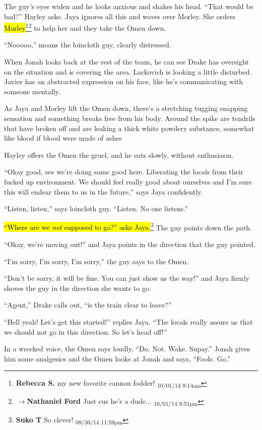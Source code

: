 The guy's eyes widen and he looks anxious and shakes his head.  ``That would be bad?'' Hayley asks.  Jaya ignores all this and waves over Morley.  She orders \hl{Morley}\footnote{\textbf{Rebecca S. }my new favorite cannon fodder! \textsubscript{10/01/14 9:14am}}\footnote{$\rightarrow$\textbf{Nathaniel Ford }Just cus he's a dude... \textsubscript{10/01/14 9:51pm}} to help her and they take the Omen down.

``Nooooo,'' moans the loincloth guy, clearly distressed.

When Jonah looks back at the rest of the team, he can see Drake has oversight on the situation and is covering the area.  Lackovich is looking a little disturbed.  Javier has an abstracted expression on his face, like he's communicating with someone mentally.

As Jaya and Morley lift the Omen down, there's a stretching tugging snapping sensation and something breaks free from his body.  Around the spike are tendrils that have broken off and are leaking a thick white powdery substance, somewhat like blood if blood were made of ashes

Hayley offers the Omen the gruel, and he eats slowly, without enthusiasm.

``Okay good, see we're doing some good here.  Liberating the locals from their fucked up environment.  We should feel really good about ourselves and I'm sure this will endear them to us in the future,'' says Jaya confidently.

``Listen, listen,'' says loincloth guy. ``Listen. No one listens.''

\hl{``Where are we \textit{not} supposed to go?'' asks Jaya.}\footnote{\textbf{Suko T }So clever! \textsubscript{09/30/14 11:59pm}}  The guy points down the path.

``Okay, we're moving out!'' and Jaya points in the direction that the guy pointed.

``I'm sorry, I'm sorry, I'm sorry,'' the guy says to the Omen.

``Don't be sorry, it will be fine.  You can just show us the way!'' and Jaya firmly shoves the guy in the direction she wants to go.

``Agent,'' Drake calls out, ``is the train clear to leave?''

``Hell yeah!  Let's get this started!'' replies Jaya.  ``The locals really assure us that we should not go in this direction.  So let's head off!''

In a wrecked voice, the Omen says loudly, ``Do.  Not.  Wake.  Supay.''  Jonah gives him some analgesics and the Omen looks at Jonah and says, ``Fools.  Go.''




